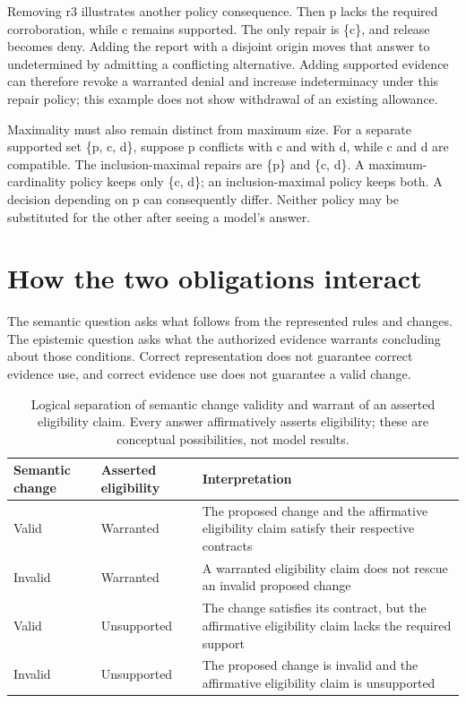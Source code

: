 \documentclass[a4paper,preprint,12pt,numbers,nopreprintline]{elsarticle}
\begin{document}
Removing r3 illustrates another policy consequence. Then p lacks the required corroboration, while c remains supported. The only repair is \{c\}, and release becomes deny. Adding the report with a disjoint origin moves that answer to undetermined by admitting a conflicting alternative. Adding supported evidence can therefore revoke a warranted denial and increase indeterminacy under this repair policy; this example does not show withdrawal of an existing allowance.

Maximality must also remain distinct from maximum size. For a separate supported set \{p, c, d\}, suppose p conflicts with c and with d, while c and d are compatible. The inclusion-maximal repairs are \{p\} and \{c, d\}. A maximum-cardinality policy keeps only \{c, d\}; an inclusion-maximal policy keeps both. A decision depending on p can consequently differ. Neither policy may be substituted for the other after seeing a model's answer.

\section{How the two obligations interact}

The semantic question asks what follows from the represented rules and changes. The epistemic question asks what the authorized evidence warrants concluding about those conditions. Correct representation does not guarantee correct evidence use, and correct evidence use does not guarantee a valid change.

\begin{table}[htbp]\centering\small
\caption{Logical separation of semantic change validity and warrant of an asserted eligibility claim. Every answer affirmatively asserts eligibility; these are conceptual possibilities, not model results.}\label{tab:foundation-4}

\begin{tabularx}{\linewidth}{@{}*{3}{>{\raggedright\arraybackslash}X}@{}}\toprule
Semantic change & Asserted eligibility & Interpretation\\
\midrule
Valid & Warranted & The proposed change and the affirmative eligibility claim satisfy their respective contracts\\
Invalid & Warranted & A warranted eligibility claim does not rescue an invalid proposed change\\
Valid & Unsupported & The change satisfies its contract, but the affirmative eligibility claim lacks the required support\\
Invalid & Unsupported & The proposed change is invalid and the affirmative eligibility claim is unsupported\\
\bottomrule\end{tabularx}
\end{table}
\end{document}
